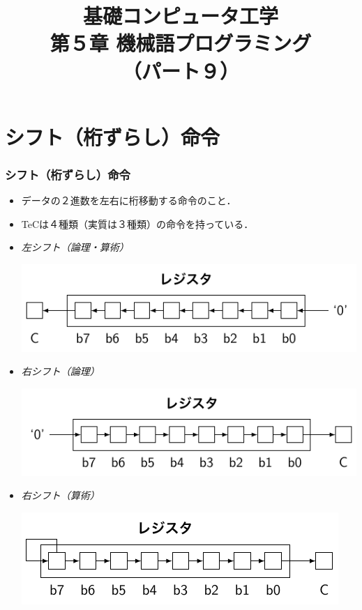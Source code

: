 \documentclass{beamer}                 %
\begin{document}
\title{基礎コンピュータ工学\\第５章 機械語プログラミング\\（パート９）}
\date{}

\begin{frame}
  \titlepage
\end{frame}


\section{シフト（桁ずらし）命令}
\begin{frame}
  \frametitle{シフト（桁ずらし）命令}
  \begin{itemize}
  \item データの２進数を左右に桁移動する命令のこと．
  \item TeCは４種類（実質は３種類）の命令を持っている．
  \item \emph{左シフト（論理・算術）}\\
    \vspace{-0.3cm}\centerline{\includegraphics[scale=0.7]{../Tikz/shft1.pdf}}
  \item \emph{右シフト（論理）}\\
    \centerline{\includegraphics[scale=0.7]{../Tikz/shft3.pdf}}
  \item \emph{右シフト（算術）}\\
    \centerline{\includegraphics[scale=0.7]{../Tikz/shft2.pdf}}
  \end{itemize}
  \vfill
\end{frame}
\end{document}
